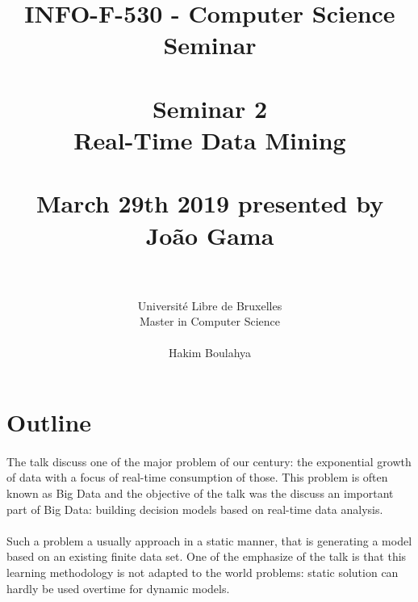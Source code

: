 \documentclass[11pt,a4paper]{article}
\begin{document}

\title{
\large INFO-F-530 - Computer Science Seminar \\~\\
\LARGE Seminar 2 \\ Real-Time Data Mining \\~\\
\Large March 29th 2019 presented by João Gama \\~\\}
\author{Université Libre de Bruxelles
\\ Master in Computer Science \\
\\ Hakim Boulahya}
\maketitle

\setcounter{section}{0}
\setcounter{page}{1}

\section{Outline}

\paragraph{}

The talk discuss one of the major problem of our century: the exponential growth of data with a focus of real-time consumption of those. This problem is often known as Big Data and the objective of the talk was the discuss an important part of Big Data: building decision models based on real-time data analysis.

\paragraph{}

Such a problem a usually approach in a static manner, that is generating a model based on an existing finite data set. One of the emphasize of the talk is that this learning methodology is not adapted to the world problems: static solution can hardly be used overtime for dynamic models.

\paragraph{}
\end{document}
